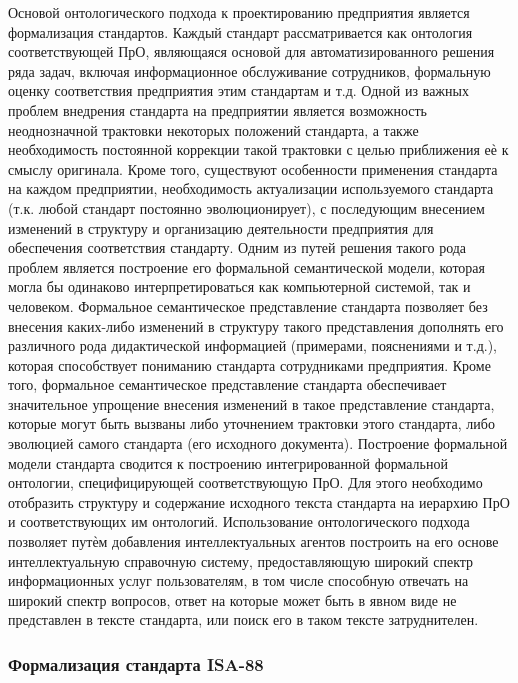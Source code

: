 Основой онтологического подхода к проектированию предприятия является формализация стандартов. Каждый стандарт рассматривается как онтология соответствующей ПрО, являющаяся основой для автоматизированного решения ряда задач, включая информационное обслуживание сотрудников, формальную оценку соответствия предприятия этим стандартам и т.д.
Одной из важных проблем внедрения стандарта на предприятии является возможность неоднозначной трактовки некоторых положений стандарта, а также необходимость постоянной коррекции такой трактовки с целью приближения еѐ к смыслу оригинала. Кроме того, существуют особенности применения стандарта на каждом предприятии, необходимость актуализации используемого стандарта (т.к. любой стандарт постоянно эволюционирует), с последующим внесением изменений в структуру и организацию деятельности предприятия для
обеспечения соответствия стандарту.
Одним из путей решения такого рода проблем является построение его формальной семантической модели, которая могла бы одинаково интерпретироваться как компьютерной системой, так и человеком. Формальное семантическое представление стандарта позволяет без внесения каких-либо изменений в структуру такого представления дополнять его различного рода  дидактической информацией (примерами, пояснениями и т.д.), которая способствует пониманию стандарта сотрудниками предприятия. Кроме того, формальное семантическое представление стандарта обеспечивает значительное упрощение внесения изменений в такое представление стандарта, которые могут быть вызваны либо уточнением трактовки этого стандарта, либо эволюцией самого стандарта (его исходного документа).
Построение формальной модели стандарта сводится к построению интегрированной формальной онтологии, специфицирующей соответствующую ПрО. Для этого необходимо отобразить структуру и содержание исходного текста стандарта на иерархию ПрО и соответствующих им онтологий.
Использование онтологического подхода позволяет путѐм добавления интеллектуальных агентов построить на его основе интеллектуальную справочную систему, предоставляющую широкий спектр информационных услуг пользователям, в том числе способную отвечать на широкий спектр вопросов, ответ на которые может быть в явном виде не представлен в тексте стандарта, или поиск его в таком тексте затруднителен.

\subsubsection{Формализация стандарта ISA-88}

